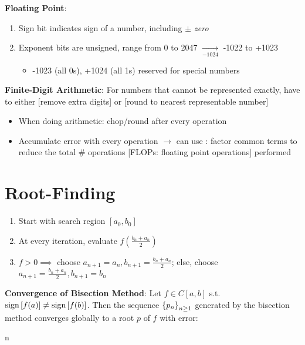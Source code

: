 \documentclass[12pt]{extarticle}
\begin{document}
\newp
\textbf{Floating Point}: \begin{enumerate}
    \item Sign bit indicates sign of a number, including \textit{$\pm$ zero}
    \item Exponent bits are unsigned, range from 0 to 2047 $\underset{-1024}{\longrightarrow}$ -1022 to +1023 \begin{itemize}
        \item -1023 (all 0s), +1024 (all 1s) reserved for special numbers
    \end{itemize}
\end{enumerate}


\pstart
\textbf{Finite-Digit Arithmetic}: For numbers that cannot be represented exactly, have to either  [remove extra digits] or  [round to nearest representable number] \begin{itemize}
    \item When doing arithmetic: chop/round after every operation
    \item Accumulate error with every operation $\to$ can use : factor common terms to reduce the total \# operations [FLOPs: floating point operations] performed
\end{itemize}


\pagebreak
\section{Root-Finding}
\begin{whitebox}
     \begin{enumerate}
        \item Start with search region $[a_0,b_0]$
        \item At every iteration, evaluate $f(\frac{b_n+a_n}{2})$
        \item $f>0\implies$ choose $a_{n+1}=a_n,b_{n+1}=\frac{b_n+a_n}{2}$; else, choose $a_{n+1}=\frac{b_n+a_n}{2},b_{n+1}=b_n$
    \end{enumerate}
\end{whitebox}

\newp
\textbf{Convergence of Bisection Method}: Let $f\in C[a,b]$ s.t. $\text{sign}\left[f(a)\right]\neq\text{sign}\left[f(b)\right]$. Then the sequence $\left\{p_n\right\}_{n\geq1}$ generated by the bisection method converges globally to a root $p$ of $f$ with error: \begin{eqnbox}
    \leq{}\;\forall\;n
\end{eqnbox}
\end{document}
